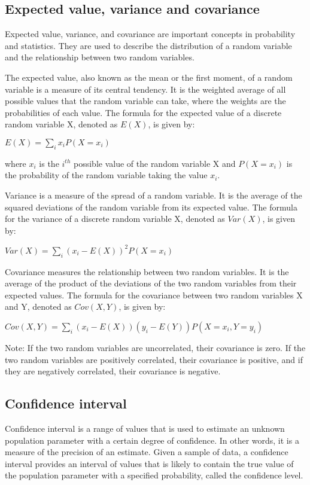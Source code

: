 \documentclass[12pt, a4paper, oneside]{article}
\begin{document}
\subsection{ Expected value, variance and covariance }

Expected value, variance, and covariance are important concepts in probability and statistics. They are used to describe the distribution of a random variable and the relationship between two random variables.

The expected value, also known as the mean or the first moment, of a random variable is a measure of its central tendency. It is the weighted average of all possible values that the random variable can take, where the weights are the probabilities of each value. The formula for the expected value of a discrete random variable X, denoted as $E(X)$, is given by:

$E(X) = \sum_{i} x_i P(X = x_i)$

where $x_i$ is the $i^{th}$ possible value of the random variable X and $P(X = x_i)$ is the probability of the random variable taking the value $x_i$.

Variance is a measure of the spread of a random variable. It is the average of the squared deviations of the random variable from its expected value. The formula for the variance of a discrete random variable X, denoted as $Var(X)$, is given by:

$Var(X) = \sum_{i} (x_i - E(X))^2 P(X = x_i)$

Covariance measures the relationship between two random variables. It is the average of the product of the deviations of the two random variables from their expected values. The formula for the covariance between two random variables X and Y, denoted as $Cov(X, Y)$, is given by:

$Cov(X, Y) = \sum_{i} (x_i - E(X))(y_i - E(Y))P(X = x_i, Y = y_i)$

Note: If the two random variables are uncorrelated, their covariance is zero. If the two random variables are positively correlated, their covariance is positive, and if they are negatively correlated, their covariance is negative.
\subsection{ Confidence interval }
Confidence interval is a range of values that is used to estimate an unknown population parameter with a certain degree of confidence. In other words, it is a measure of the precision of an estimate. Given a sample of data, a confidence interval provides an interval of values that is likely to contain the true value of the population parameter with a specified probability, called the confidence level.
\end{document}
